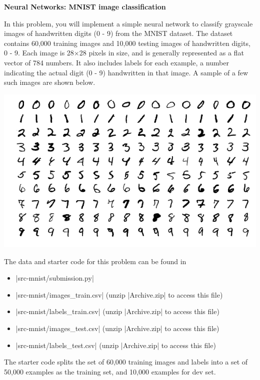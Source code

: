 \item {\bf Neural Networks: MNIST image classification}

In this problem, you will implement a simple neural network
to classify grayscale images of handwritten digits (0 - 9) from
the MNIST dataset. The dataset contains 60,000 training images and
10,000 testing images of handwritten digits, 0 - 9. Each image is
28$\times$28 pixels in size, and is generally represented as a flat
vector of 784 numbers. It also includes labels for each example, a number
indicating the actual digit (0 - 9) handwritten in that image. A sample of
a few such images are shown below.

\begin{center}
\includegraphics[scale=0.5]{02-mnist/mnist_plot}
\end{center}


The data and starter code for this problem can be found in

\begin{itemize}
\item |src-mnist/submission.py|
\item |src-mnist/images_train.csv| (unzip |Archive.zip| to access this file)
\item |src-mnist/labels_train.csv| (unzip |Archive.zip| to access this file)
\item |src-mnist/images_test.csv| (unzip |Archive.zip| to access this file)
\item |src-mnist/labels_test.csv| (unzip |Archive.zip| to access this file)
\end{itemize}

The starter code splits the set
of 60,000 training images and labels into a set of 50,000 examples as
the training set, and 10,000 examples for dev set.

